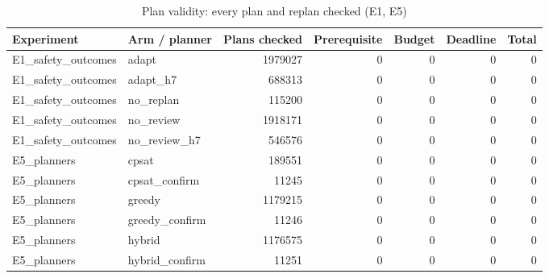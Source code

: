 \begin{table}[htbp]
\centering\small
\caption{Plan validity: every plan and replan checked (E1, E5)}
\label{tab:t1b}
\begin{tabular}{llrrrrr}
\toprule
Experiment & Arm / planner & Plans checked & Prerequisite & Budget & Deadline & Total \\
\midrule
E1\_safety\_outcomes & adapt & 1979027 & 0 & 0 & 0 & 0 \\
E1\_safety\_outcomes & adapt\_h7 & 688313 & 0 & 0 & 0 & 0 \\
E1\_safety\_outcomes & no\_replan & 115200 & 0 & 0 & 0 & 0 \\
E1\_safety\_outcomes & no\_review & 1918171 & 0 & 0 & 0 & 0 \\
E1\_safety\_outcomes & no\_review\_h7 & 546576 & 0 & 0 & 0 & 0 \\
E5\_planners & cpsat & 189551 & 0 & 0 & 0 & 0 \\
E5\_planners & cpsat\_confirm & 11245 & 0 & 0 & 0 & 0 \\
E5\_planners & greedy & 1179215 & 0 & 0 & 0 & 0 \\
E5\_planners & greedy\_confirm & 11246 & 0 & 0 & 0 & 0 \\
E5\_planners & hybrid & 1176575 & 0 & 0 & 0 & 0 \\
E5\_planners & hybrid\_confirm & 11251 & 0 & 0 & 0 & 0 \\
\bottomrule
\end{tabular}
\end{table}
